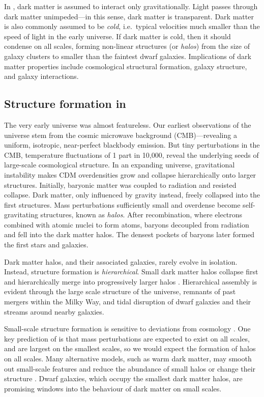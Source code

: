 In \LCDM{}, dark matter is assumed to interact only gravitationally.
Light passes through dark matter unimpeded---in this sense, dark matter
is transparent. Dark matter is also commonly assumed to be \emph{cold},
i.e.~typical velocities much smaller than the speed of light in the
early universe. If dark matter is cold, then it should condense on all
scales, forming non-linear structures (or \emph{halos}) from the size of
galaxy clusters to smaller than the faintest dwarf galaxies.
Implications of dark matter properties include cosmological structural
formation, galaxy structure, and galaxy interactions.

\subsection{\texorpdfstring{Structure formation in
\LCDM{}}{Structure formation in }}\label{structure-formation-in}

The very early universe was almost featureless. Our earliest
observations of the universe stem from the cosmic microwave background
(CMB)---revealing a uniform, isotropic, near-perfect blackbody emission.
But tiny perturbations in the CMB, temperature fluctuations of 1 part in
10,000, reveal the underlying seeds of large-scale cosmological
structure. In an expanding universe, gravitational instability makes CDM
overdensities grow and collapse hierarchically onto larger structures.
Initially, baryonic matter was coupled to radiation and resisted
collapse. Dark matter, only influenced by gravity instead, freely
collapsed into the first structures. Mass perturbations sufficiently
small and overdense become self-gravitating structures, known as
\emph{halos}. After recombination, where electrons combined with atomic
nuclei to form atoms, baryons decoupled from radiation and fell into the
dark matter halos. The densest pockets of baryons later formed the first
stars and galaxies.

Dark matter halos, and their associated galaxies, rarely evolve in
isolation. Instead, \LCDM{} structure formation is \emph{hierarchical}.
Small dark matter halos collapse first and hierarchically merge into
progressively larger halos
\citep[e.g.,][]{blumenthal+1984, white+rees1978, white+frenk1991}.
Hierarchical assembly is evident through the large scale structure of
the universe, remnants of past mergers within the Milky Way, and tidal
disruption of dwarf galaxies and their streams around nearby galaxies.

Small-scale structure formation is sensitive to deviations from \LCDM{}
cosmology \citep[e.g.,][]{bechtol+2022}. One key prediction of \LCDM{}
is that mass perturbations are expected to exist on all scales, and are
largest on the smallest scales, so we would expect the formation of
halos on all scales. Many alternative models, such as warm dark matter,
may smooth out small-scale features and reduce the abundance of small
halos or change their structure \citep[e.g.,][]{lovell+2014}. Dwarf
galaxies, which occupy the smallest dark matter halos, are promising
windows into the behaviour of dark matter on small scales.

